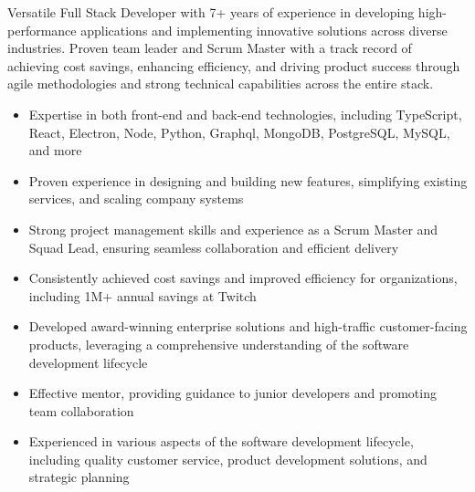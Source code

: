 \par
Versatile Full Stack Developer with 7+ years of experience in developing high-performance applications and implementing innovative solutions across diverse industries.
Proven team leader and Scrum Master with a track record of achieving cost savings, enhancing efficiency, and driving product success through agile methodologies and strong technical capabilities across the entire stack.

\begin{itemize}[itemsep=-5pt]
    \item Expertise in both front-end and back-end technologies, including TypeScript, React, Electron, Node, Python, Graphql, MongoDB, PostgreSQL, MySQL, and more
    \item Proven experience in designing and building new features, simplifying existing services, and scaling company systems
    \item Strong project management skills and experience as a Scrum Master and Squad Lead, ensuring seamless collaboration and efficient delivery
    \item Consistently achieved cost savings and improved efficiency for organizations, including \textdollar 1M+ annual savings at Twitch
    \item Developed award-winning enterprise solutions and high-traffic customer-facing products, leveraging a comprehensive understanding of the software development lifecycle
    \item Effective mentor, providing guidance to junior developers and promoting team collaboration
    \item Experienced in various aspects of the software development lifecycle, including quality customer service, product development solutions, and strategic planning
\end{itemize}